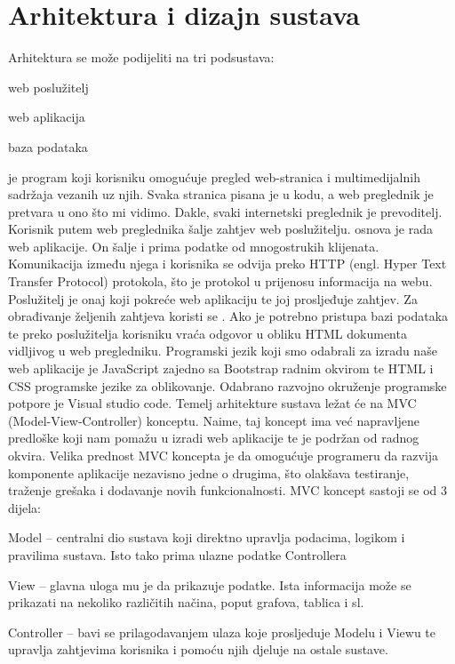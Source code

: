 \chapter{Arhitektura i dizajn sustava}
Arhitektura se može podijeliti na tri podsustava:
\begin{packed_item}
	\item web poslužitelj
	\item web aplikacija
	\item baza podataka
\end{packed_item}
 je program koji korisniku omogućuje pregled web-stranica i multimedijalnih sadržaja vezanih uz njih. Svaka stranica pisana je u kodu, a web preglednik je pretvara u ono što mi vidimo. Dakle, svaki internetski preglednik je
prevoditelj. Korisnik putem web preglednika šalje zahtjev web poslužitelju.
\newline {} osnova je rada web aplikacije. On šalje i prima podatke od mnogostrukih klijenata. Komunikacija između njega i korisnika se odvija preko HTTP (engl. Hyper Text Transfer Protocol) protokola, što je protokol u prijenosu informacija na webu. Poslužitelj je onaj koji pokreće web aplikaciju te joj prosljeđuje
zahtjev.
\newline Za obrađivanje željenih zahtjeva koristi se . Ako je potrebno pristupa
bazi podataka te preko poslužitelja korisniku vraća odgovor u obliku HTML dokumenta vidljivog u web pregledniku.
\newline Programski jezik koji smo odabrali za izradu naše web aplikacije je JavaScript zajedno
sa Bootstrap radnim okvirom te HTML i CSS programske jezike za oblikovanje.
Odabrano razvojno okruženje programske potpore je Visual studio code.
\newline Temelj arhitekture sustava ležat će na MVC (Model-View-Controller) konceptu. Naime, taj koncept ima već napravljene predloške koji nam pomažu u izradi web aplikacije te je podržan od radnog okvira. Velika prednost MVC koncepta je da omogućuje programeru da razvija komponente aplikacije nezavisno jedne o drugima,
što olakšava testiranje, traženje grešaka i dodavanje novih funkcionalnosti.
\newline MVC koncept sastoji se od 3 dijela:
\begin{packed_item}
	\item Model – centralni dio sustava koji direktno upravlja podacima, logikom i pravilima sustava. Isto tako prima ulazne podatke Controllera
	\item View – glavna uloga mu je da prikazuje podatke. Ista informacija može se prikazati na nekoliko različitih načina, poput grafova, tablica i sl.
	\item Controller – bavi se prilagodavanjem ulaza koje prosljeduje Modelu i Viewu te upravlja zahtjevima korisnika i pomoću njih djeluje na ostale sustave.
\end{packed_item}

